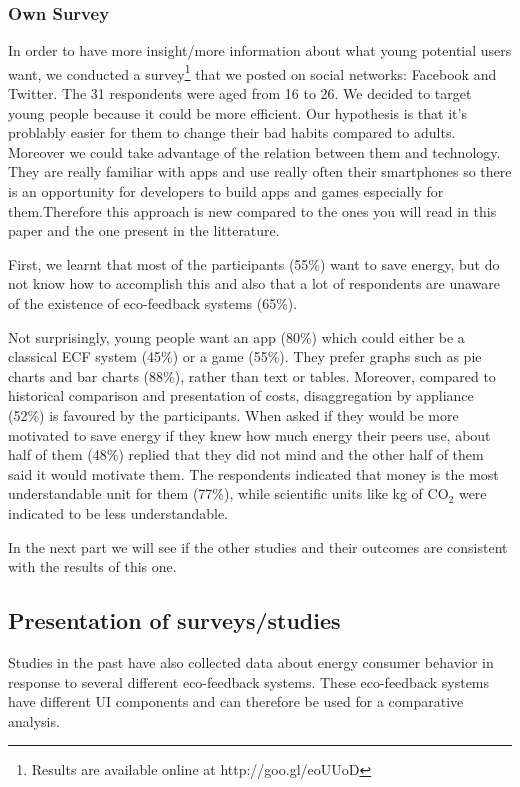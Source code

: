\documentclass[journal]{vgtc}                %
\begin{document}
\subsubsection{Own Survey}

In order to have more insight/more information about what young potential users want, we conducted a survey\footnote{Results are available online at {http://goo.gl/eoUUoD}} that we posted on social networks: Facebook and Twitter.
The 31 respondents were aged from 16 to 26.%
We decided to target young people because it could be more efficient. Our hypothesis is that it's problably easier for them to change their bad habits compared to adults. Moreover we could take advantage of the relation between them and technology. They are really familiar with apps and use really often their smartphones so there is an opportunity for developers to build apps and games especially for them.Therefore this approach is new compared to the ones you will read in this paper and the one present in the litterature.

First, we learnt that most of the participants (55\%) want to save energy, but do not know how to accomplish this and also that a lot of respondents are unaware of the existence of eco-feedback systems (65\%).
 
Not surprisingly, young people want an app (80\%) which could either be a classical ECF system (45\%) or a game (55\%).
They prefer graphs such as pie charts and bar charts (88\%), rather than text or tables. 
Moreover, compared to historical comparison and presentation of costs, disaggregation by appliance (52\%) is favoured by the participants.
When asked if they would be more motivated to save energy if they knew how much energy their peers use, about half of them (48\%) replied that they did not mind and the other half of them said it would motivate them.
The respondents indicated that money is the most understandable unit for them (77\%), while scientific units like kg of CO$_2$ were indicated to be less understandable.

In the next part we will see if the other studies and their outcomes are consistent with the results of this one.



\subsection{Presentation of surveys/studies} %
Studies in the past have also collected data about energy consumer behavior in response to several different eco-feedback systems. These eco-feedback systems have different UI components and can therefore be used for a comparative analysis.
\end{document}

